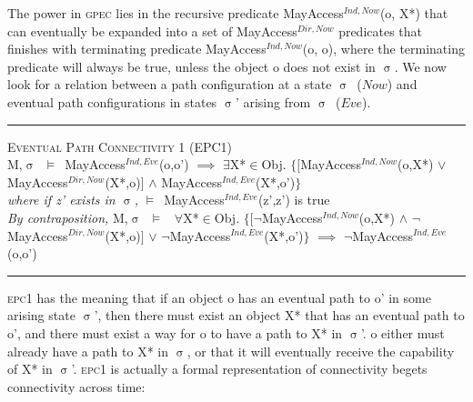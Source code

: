 \documentclass[a4paper,11pt, twoside,twocolumn]{article}
\newenvironment{logic}[1][]
{\begin{flushleft} \small }
{\end{flushleft}}
\newcommand{\loin}{$\in$}
\newcommand{\loforall}{$\forall$}
\newcommand{\loexists}{$\exists$}
\newcommand{\loand}{$\land$}
\newcommand{\loor} {$\lor$}
\newcommand{\loimplies}{$\implies$}
\newcommand{\losigma}{$\upsigma$}
\newcommand{\loturns} {$\vDash$}
\newcommand{\loneg}{$\boldsymbol \neg$}
\newcommand{\ablock} {\null\qquad}
\begin{document}
The power in \textsc{gpec} lies in the recursive predicate MayAccess$^{Ind,Now}$(o, X*) that can eventually be expanded into a set of MayAccess$^{Dir,Now}$ predicates that finishes with terminating predicate MayAccess$^{Ind,Now}$(o, o), where the terminating predicate will always be true, unless the object o does not exist in \losigma.
We now look for a relation between a path configuration at a state \losigma\ ($Now$) and eventual path configurations in states \losigma' arising from \losigma\ ($Eve$).\vfill
\begin{minipage}{\linewidth}
\begin{logic}
\hrule\null
\textsc{\normalsize *Eventual Path Connectivity 1 (EPC1)}\\
M,\losigma\ \loturns\ MayAccess$^{Ind,Eve}$(o,o')\linebreak
\ablock \loimplies\linebreak
\ablock \loexists X*\loin Obj. $\{[$MayAccess$^{Ind,Now}$(o,X*)\linebreak
\ablock \ablock \ablock \ablock\loor \linebreak
\ablock \ablock \ablock \quad\: MayAccess$^{Dir,Now}$(X*,o)$]$\linebreak
\ablock \ablock \ablock \quad \loand \linebreak
\ablock \ablock \ablock \quad MayAccess$^{Ind,Eve}$(X*,o')$\}$
\\
\ablock \textit{where if z' exists in \losigma,} \linebreak
\ablock \loturns\ MayAccess$^{Ind,Eve}$(z',z') is true \linebreak
\\
\textit{By contraposition,}\linebreak
M,\losigma\ \loturns\ \linebreak
\ablock \loforall X*\loin Obj. $\{[$\loneg MayAccess$^{Ind,Now}$(o,X*)\linebreak
\ablock \ablock \ablock \ablock \quad \loand \linebreak
\ablock \ablock \ablock \quad\: \loneg MayAccess$^{Dir,Now}$(X*,o)$]$\linebreak
\ablock \ablock \ablock \quad \loor \linebreak
\ablock \ablock \ablock \quad \loneg MayAccess$^{Ind,Eve}$(X*,o')$\}$\linebreak
\ablock \loimplies\linebreak
	\ablock\loneg MayAccess$^{Ind,Eve}$(o,o')\linebreak
\hrule
\end{logic}
\end{minipage}
\textsc{epc1} has the meaning that if an object o has an eventual path to o' in some arising state \losigma', then there must exist an object X* that has an eventual path to o', and there must exist a way for o to have a path to X* in \losigma'. o either must already have a path to X* in \losigma, or that it will eventually receive the capability of X* in \losigma'. \textsc{epc1} is actually a formal representation of connectivity begets connectivity across time:
\end{document}

